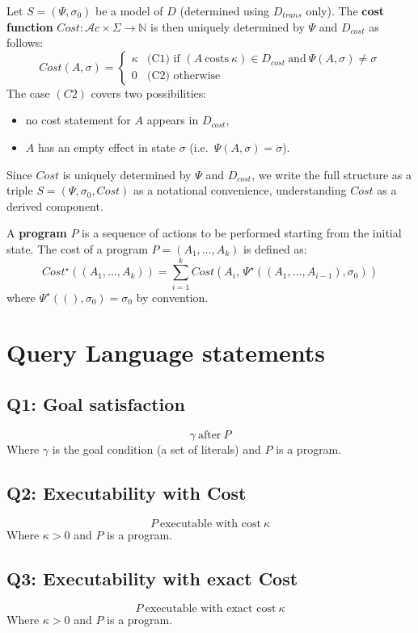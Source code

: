 \documentclass[11pt]{article}
\newcommand{\actions}{\mathcal{A}c}
\newcommand{\states}{\Sigma}
\newcommand{\parr}{\par\vspace{5mm}\noindent}
\begin{document}
\parr
Let \(S = (\Psi, \sigma_0)\) be a model of \(D\) (determined using \(D_{trans}\) only).
The \textbf{cost function}
\(Cost: \actions\times\states\rightarrow\mathbb{N}\) is then uniquely determined by \(\Psi\)
and \(D_{cost}\) as follows:
\[Cost(A, \sigma) = \begin{cases}
\kappa & \text{(C1) if } (A ~\text{costs}~ \kappa) \in D_{cost}
        ~\text{and}~ \Psi(A, \sigma)\neq\sigma \\
0      & \text{(C2) otherwise}
\end{cases}\]
The case \((C2)\) covers two possibilities:
\begin{itemize}
    \item[(a)] no cost statement for \(A\) appears in \(D_{cost}\),
    \item[(b)] \(A\) has an empty effect in state \(\sigma\) (i.e.\ \(\Psi(A,\sigma)=\sigma\)).
\end{itemize}

Since \(Cost\) is uniquely determined by \(\Psi\) and \(D_{cost}\), we write the full structure
as a triple \(S=(\Psi, \sigma_0, Cost)\) as a notational convenience, understanding \(Cost\)
as a derived component.

\parr
A \textbf{program} \(P\) is a sequence of actions to be performed starting from the initial state.
The cost of a program \(P=(A_1,\ldots,A_k)\) is defined as:
\[Cost^\star((A_1,\ldots,A_k)) = \sum_{i=1}^k Cost\!\left(A_i,\, \Psi^\star((A_1,\ldots,A_{i-1}), \sigma_0)\right)\]
where \(\Psi^\star((), \sigma_0) = \sigma_0\) by convention.

\section{Query Language statements}

\subsection*{Q1: Goal satisfaction}
\[\gamma ~\text{after}~ P\]
Where \(\gamma\) is the goal condition (a set of literals) and \(P\) is a program.

\subsection*{Q2: Executability with Cost}
\[P ~\text{executable with cost}~ \kappa\]
Where \(\kappa > 0\) and \(P\) is a program.

\subsection*{Q3: Executability with exact Cost}
\[P ~\text{executable with exact cost}~ \kappa\]
Where \(\kappa > 0\) and \(P\) is a program.
\end{document}
